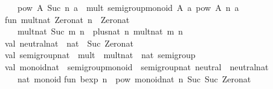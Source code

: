 \begin{isabellebody}
\begin{isamarkuptext}
\ \ {}\ pow\ A{}\ {}Suc\ n{}\ a\ {}\ mult\ {}semigroup{}monoid\ A{}{}\ a\ {}pow\ A{}\ n\ a{}{}\isanewline
\isanewline
fun\ mult{}nat\ Zero{}nat\ n\ {}\ Zero{}nat\isanewline
\ \ {}\ mult{}nat\ {}Suc\ m{}\ n\ {}\ plus{}nat\ n\ {}mult{}nat\ m\ n{}{}\isanewline
\isanewline
val\ neutral{}nat\ {}\ nat\ {}\ Suc\ Zero{}nat{}\isanewline
\isanewline
val\ semigroup{}nat\ {}\ {}mult\ {}\ mult{}nat{}\ {}\ nat\ semigroup{}\isanewline
\isanewline
val\ monoid{}nat\ {}\ {}semigroup{}monoid\ {}\ semigroup{}nat{}\ neutral\ {}\ neutral{}nat{}\isanewline
\ \ {}\ nat\ monoid{}\isanewline
\isanewline
fun\ bexp\ n\ {}\ pow\ monoid{}nat\ n\ {}Suc\ {}Suc\ Zero{}nat{}{}{}\isanewline

\end{isamarkuptext}
\end{isabellebody}
